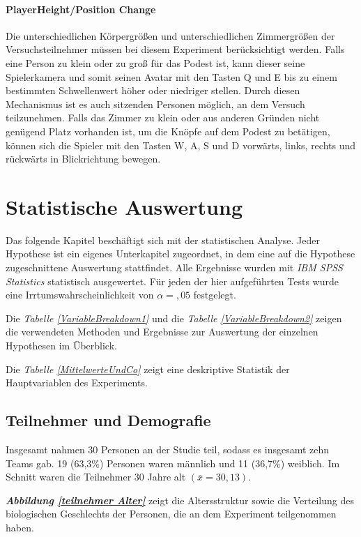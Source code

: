 \documentclass[a4paper,11pt]{article}%
\renewcommand{\\}{\vspace*{0.5\baselineskip} \newline}
\begin{document}
{\paragraph{PlayerHeight/Position Change}
Die unterschiedlichen Körpergrößen und unterschiedlichen Zimmergrößen der Versuchsteilnehmer müssen bei diesem Experiment berücksichtigt werden. Falls eine Person zu klein oder zu groß für das Podest ist, kann dieser seine Spielerkamera und somit seinen Avatar mit den Tasten Q und E bis zu einem bestimmten Schwellenwert höher oder niedriger stellen. Durch diesen Mechanismus ist es auch sitzenden Personen möglich, an dem Versuch teilzunehmen. Falls das Zimmer zu klein oder aus anderen Gründen nicht genügend Platz vorhanden ist, um die Knöpfe auf dem Podest zu betätigen, können sich die Spieler mit den Tasten W, A, S und D vorwärts, links, rechts und rückwärts in Blickrichtung bewegen.

\newpage	
\section{Statistische Auswertung}
Das folgende Kapitel beschäftigt sich mit der statistischen Analyse. Jeder Hypothese ist ein eigenes Unterkapitel zugeordnet, in dem eine auf die Hypothese zugeschnittene Auswertung stattfindet. Alle Ergebnisse wurden mit \textit{IBM SPSS Statistics} statistisch ausgewertet. 
Für jeden der hier aufgeführten Tests wurde eine Irrtumswahrscheinlichkeit von  $\alpha =,05$ festgelegt.

Die \textit{Tabelle \ref{VariableBreakdown1}} und die \textit{Tabelle \ref{VariableBreakdown2}} zeigen die verwendeten Methoden und Ergebnisse zur Auswertung der einzelnen Hypothesen im Überblick.

Die \textit{Tabelle \ref{MittelwerteUndCo}} zeigt eine deskriptive Statistik der Hauptvariablen des Experiments.
	\subsection{Teilnehmer und Demografie}
Insgesamt nahmen 30 Personen an der Studie teil, sodass es insgesamt zehn Teams gab. 19 (63,3\%) Personen waren männlich und 11 (36,7\%) weiblich. Im Schnitt waren die Teilnehmer 30 Jahre alt $(\bar{x} = 30,13)$.

\textbf{\textit{Abbildung \ref{teilnehmer Alter}}} zeigt die Altersstruktur sowie die Verteilung des biologischen Geschlechts der Personen, die an dem Experiment teilgenommen haben. 

}
\end{document}
